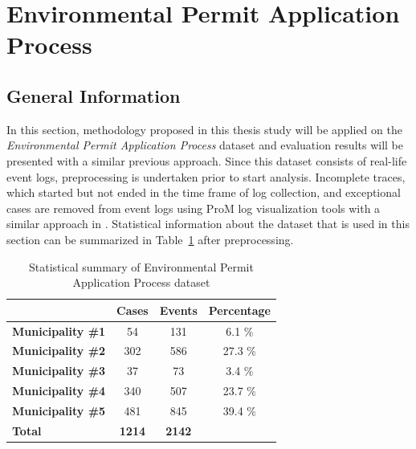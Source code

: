 \section{Environmental Permit Application Process}
\label{sec:coselog-wabo-process}

\subsection{General Information}
\label{subsec:coselog-wabo-information}

In this section, methodology proposed in this thesis study will be applied on the \textit{Environmental Permit Application Process} dataset \cite{coselog-data} and evaluation results will be presented with a similar previous approach. Since this dataset consists of real-life event logs, preprocessing is undertaken prior to start analysis. Incomplete traces, which started but not ended in the time frame of log collection, and exceptional cases are removed from event logs using ProM log visualization tools with a similar approach in \cite{buijs2014flexible}. Statistical information about the dataset that is used in this section can be summarized in Table~\ref{table:coselog-process-summary} after preprocessing.

 \begin{table}[]
\centering
\caption{Statistical summary of Environmental Permit Application Process dataset}
\label{table:coselog-process-summary}
\begin{tabular}{lccc}
\hline
                       & {\bf Cases} & {\bf Events} & {\bf Percentage} \\ \hline
{\bf Municipality \#1} & 54          & 131          & 6.1 \%           \\ \hline
{\bf Municipality \#2} & 302         & 586          & 27.3 \%          \\ \hline
{\bf Municipality \#3} & 37          & 73           & 3.4 \%           \\ \hline
{\bf Municipality \#4} & 340         & 507          & 23.7 \%          \\ \hline
{\bf Municipality \#5} & 481         & 845          & 39.4 \%          \\
{\bf Total}            & {\bf 1214}  & {\bf 2142}   & {\bf }           \\ \hline
\end{tabular}
\end{table}

